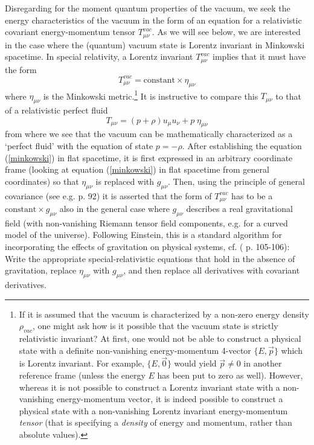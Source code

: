 \documentclass[12pt]{article}
\newcommand{\beq}{\begin{equation}}
\newcommand{\eeq}{\end{equation}}
\begin{document}
Disregarding for the moment quantum properties of the
vacuum, we seek the energy characteristics of the vacuum in the 
form of an equation for a relativistic covariant energy-momentum tensor
$T_{\mu\nu}^{vac}$. 
As we will see below, we are interested in the case where
the (quantum) vacuum state is Lorentz invariant 
in Minkowski spacetime. In special relativity,
a Lorentz invariant $T^{vac}_{\mu\nu}$ implies that it must have the form
\beq
\label{minkowski}
T_{\mu \nu}^{vac} = \mbox{constant} \times \eta_{\mu \nu}
\eeq
where $\eta_{\mu \nu}$ is the Minkowski 
metric.\footnote{If it is assumed that the vacuum is characterized by a
non-zero energy density $\rho_{vac}$, one might
ask how is it possible that the vacuum state is strictly
relativistic invariant? At first, one would not be able to
construct a physical state with a definite non-vanishing
energy-momentum 4-vector $ \{ E, \vec{p} \} $ which is
Lorentz invariant. For example, $ \{ E, \vec{0} \} $
would yield $\vec{p} \neq 0$ in another reference frame (unless
the energy $E$ has been put to zero as well). However, whereas it
is not possible to construct a Lorentz invariant state with a
non-vanishing energy-momentum vector, it is indeed possible to
construct a physical state with a non-vanishing Lorentz invariant
energy-momentum {\em tensor} (that is specifying a {\em density}
of energy and momentum, rather than absolute values).}
It is instructive
to compare this $T_{\mu\nu}$ to that of  
a relativistic perfect fluid
\beq
\label{perffluid}
T_{\mu\nu}=(p+\rho)u_{\mu}u_{\nu}+p \; \eta_{\mu\nu}
\eeq
from where we see that the vacuum can be mathematically
characterized as a `perfect fluid' with the equation of state 
$p=-\rho$.
After establishing the equation (\ref{minkowski})
in flat spacetime, it is first expressed in
an arbitrary coordinate frame (looking at equation
(\ref{minkowski}) in flat
spacetime from general coordinates) so that $\eta_{\mu \nu}$ is
replaced with $g_{\mu \nu}$. Then, using the 
principle of general covariance
(see e.g. \cite{weinberg72} p. 92)
it is asserted that the form of $T_{\mu \nu}^{vac}$ has to
be a $\mbox{constant} \times g_{\mu \nu}$ also in the general
case where 
$g_{\mu \nu}$ describes a real gravitational field (with non-vanishing
Riemann tensor field components, e.g. for a curved model of the
universe). Following Einstein, this is a standard algorithm for 
incorporating the effects of gravitation on
physical systems, cf. (\cite{weinberg72} p. 105-106): Write the
appropriate special-relativistic equations that hold in the
absence of gravitation, replace $\eta_{\mu \nu}$ with
$g_{\mu \nu}$, and then replace all derivatives with
covariant derivatives.
\end{document}

